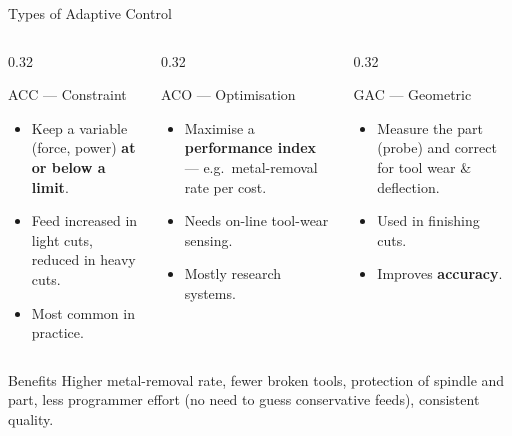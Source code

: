 \documentclass[aspectratio=169]{beamer}
\begin{document}
	\begin{frame}{Types of Adaptive Control}
		\begin{columns}[T]
			\begin{column}{0.32\textwidth}
				\begin{block}{ACC --- Constraint}
					\begin{itemize}\small
						\item Keep a variable (force, power) \textbf{at or below a limit}.
						\item Feed increased in light cuts, reduced in heavy cuts.
						\item Most common in practice.
					\end{itemize}
				\end{block}
			\end{column}
			\begin{column}{0.32\textwidth}
				\begin{block}{ACO --- Optimisation}
					\begin{itemize}\small
						\item Maximise a \textbf{performance index} --- e.g.\ metal-removal rate per cost.
						\item Needs on-line tool-wear sensing.
						\item Mostly research systems.
					\end{itemize}
				\end{block}
			\end{column}
			\begin{column}{0.32\textwidth}
				\begin{block}{GAC --- Geometric}
					\begin{itemize}\small
						\item Measure the part (probe) and correct for tool wear \& deflection.
						\item Used in finishing cuts.
						\item Improves \textbf{accuracy}.
					\end{itemize}
				\end{block}
			\end{column}
		\end{columns}
		\vspace{0.3cm}
		\begin{block}{Benefits}
			\small Higher metal-removal rate, fewer broken tools, protection of spindle and part, less programmer effort (no need to guess conservative feeds), consistent quality.
		\end{block}
	\end{frame}
\end{document}
